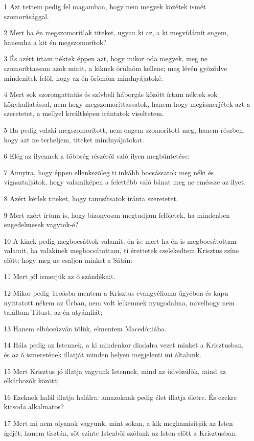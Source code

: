 \par 1 Azt tettem pedig fel magamban, hogy nem megyek közétek ismét szomorúsággal.
\par 2 Mert ha én megszomorítlak titeket, ugyan ki az, a ki megvídámít engem, hanemha a kit én megszomorítok?
\par 3 És azért írtam néktek éppen azt, hogy mikor oda megyek, meg ne szomoríttassam azok miatt, a kiknek örülnöm kellene; meg lévén gyõzõdve mindenitek felõl, hogy az én örömöm mindnyájatoké.
\par 4 Mert sok szorongattatás és szívbeli háborgás között írtam néktek sok könyhullatással, nem hogy megszomoríttassatok, hanem hogy megismerjétek azt a szeretetet, a mellyel kiváltképen irántatok viseltetem.
\par 5 Ha pedig valaki megszomorított, nem engem szomorított meg, hanem részben, hogy azt ne terheljem, titeket mindnyájatokat.
\par 6 Elég az ilyennek a többség részérõl való ilyen megbüntetése:
\par 7 Annyira, hogy éppen ellenkezõleg ti inkább bocsássatok meg néki és vígasztaljátok, hogy valamiképen a felettébb való bánat meg ne eméssze az ilyet.
\par 8 Azért kérlek titeket, hogy tanusítsatok iránta szeretetet.
\par 9 Mert azért írtam is, hogy bizonyosan megtudjam felõletek, ha mindenben engedelmesek vagytok-é?
\par 10 A kinek pedig megbocsáttok valamit, én is: mert ha én is megbocsátottam valamit, ha valakinek megbocsátottam, ti érettetek cselekedtem Krisztus színe elõtt; hogy meg ne csaljon minket a Sátán:
\par 11 Mert jól ismerjük az õ szándékait.
\par 12 Mikor pedig Troásba mentem a Krisztus evangyélioma ügyében és kapu nyittatott nékem  az Úrban, nem volt lelkemnek nyugodalma, mivelhogy nem találtam Titust, az én atyámfiát;
\par 13 Hanem elbúcsúzván tõlük, elmentem Macedóniába.
\par 14 Hála pedig az Istennek, a ki mindenkor diadalra vezet minket a Krisztusban, és az õ ismeretének illatját minden helyen megjelenti mi általunk.
\par 15 Mert Krisztus jó illatja vagyunk Istennek, mind az üdvözülõk, mind az elkárhozók között;
\par 16 Ezeknek halál illatja halálra; amazoknak pedig élet illatja életre. És ezekre kicsoda alkalmatos?
\par 17 Mert mi nem olyanok vagyunk, mint sokan, a kik meghamisítják az Isten ígéjét; hanem tisztán, sõt szinte Istenbõl szólunk az Isten elõtt a Krisztusban.

